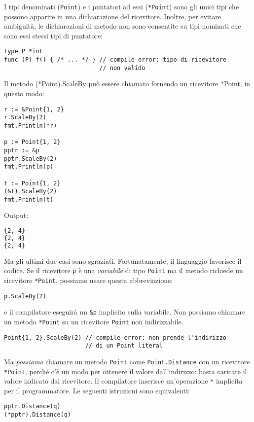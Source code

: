 I tipi denominati (\verb|Point|) e i puntatori ad essi (\verb|*Point|) sono gli unici tipi che possono apparire in una dichiarazione del ricevitore.
Inoltre, per evitare ambiguità, le dichiarazioni di metodo non sono consentite su tipi nominati che sono essi stessi tipi di puntatore:
\begin{lstlisting}[frame=single, label={lst:lstlisting5-2.2}]
type P *int
func (P) f() { /* ... */ } // compile error: tipo di ricevitore
                           // non valido
\end{lstlisting}
Il metodo (*Point).ScaleBy può essere chiamato fornendo un ricevitore *Point, in questo modo:
\begin{lstlisting}[frame=single, label={lst:lstlisting5-2.3}]
r := &Point{1, 2}
r.ScaleBy(2)
fmt.Println(*r)

p := Point{1, 2}
pptr := &p
pptr.ScaleBy(2)
fmt.Println(p)

t := Point{1, 2}
(&t).ScaleBy(2)
fmt.Println(t)
\end{lstlisting}
Output:
\begin{lstlisting}[language=bash, frame=L, label={lst:lstlisting5-2.4}]
{2, 4}
{2, 4}
{2, 4}
\end{lstlisting}
Ma gli ultimi due casi sono sgraziati.
Fortunatamente, il linguaggio favorisce il codice.
Se il ricevitore \verb|p| è una \textit{variabile} di tipo \verb|Point| ma il metodo richiede un ricevitore \verb|*Point|, possiamo usare questa abbreviazione:
\begin{lstlisting}[frame=single, label={lst:lstlisting5-2.5}]
p.ScaleBy(2)
\end{lstlisting}
e il compilatore eseguirà un \verb|&p| implicito sulla variabile.
Non possiamo chiamare un metodo \verb|*Point| su un ricevitore \verb|Point| non indirizzabile.
\begin{lstlisting}[frame=single, label={lst:lstlisting5-2.6}]
Point{1, 2}.ScaleBy(2) // compile error: non prende l'indirizzo
                       // di un Point literal
\end{lstlisting}
Ma \textit{possiamo} chiamare un metodo \verb|Point| come \verb|Point.Distance| con un ricevitore \verb|*Point|, perché c'è un modo per ottenere il valore dall'indirizzo: basta caricare il valore indicato dal ricevitore.
Il compilatore inserisce un'operazione \verb|*| implicita per il programmatore.
Le seguenti istruzioni sono equivalenti:
\begin{lstlisting}[frame=single, label={lst:lstlisting5-2.7}]
pptr.Distance(q)
(*pptr).Distance(q)
\end{lstlisting}

